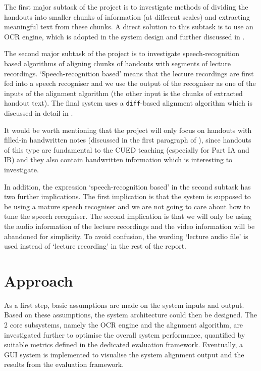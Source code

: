 The first major subtask of the project is to investigate methods of dividing the handouts into smaller chunks of information (at different scales) and extracting meaningful text from these chunks. A direct solution to this subtask is to use an OCR engine, which is adopted in the system design and further discussed in .

The second major subtask of the project is to investigate speech-recognition based algorithms of aligning chunks of handouts with segments of lecture recordings. `Speech-recognition based' means that the lecture recordings are first fed into a speech recogniser and we use the output of the recogniser as one of the inputs of the alignment algorithm (the other input is the chunks of extracted handout text). The final system uses a \texttt{diff}-based alignment algorithm which is discussed in detail in .

It would be worth mentioning that the project will only focus on handouts with filled-in handwritten notes (discussed in the first paragraph of ), since handouts of this type are fundamental to the CUED teaching (especially for Part IA and IB) and they also contain handwritten information which is interesting to investigate. 

In addition, the expression `speech-recognition based' in the second subtask has two further implications. The first implication is that the system is supposed to be using a mature speech recogniser and we are not going to care about how to tune the speech recogniser. The second implication is that we will only be using the audio information of the lecture recordings and the video information will be abandoned for simplicity. To avoid confusion, the wording `lecture audio file' is used instead of `lecture recording' in the rest of the report.

\section{Approach}

As a first step, basic assumptions are made on the system inputs and output. Based on these assumptions, the system architecture could then be designed. The 2 core subsystems, namely the OCR engine and the alignment algorithm, are investigated further to optimise the overall system performance, quantified by suitable metrics defined in the dedicated evaluation framework. Eventually, a GUI system is implemented to visualise the system alignment output and the results from the evaluation framework.

